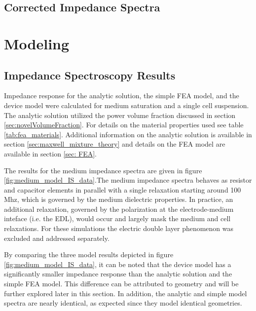 \FloatBarrier

\subsection{Corrected Impedance Spectra}

\FloatBarrier

\section{Modeling}

\subsection{Impedance Spectroscopy Results}

\par Impedance response for the analytic solution, the simple FEA model, and the device model were calculated for medium saturation and a single cell suspension. The analytic solution utilized the power volume fraction discussed in section \ref{sec:novelVolumeFraction}. For details on the material properties used see table \ref{tab:fea_materials}. Additional information on the analytic solution is available in section \ref{sec:maxwell_mixture_theory} and details on the FEA model are available in section \ref{sec: FEA}. 

\par The results for the medium impedance spectra are given in figure \ref{fig:medium_model_IS_data}.The medium impedance spectra behaves as resistor and capacitor elements in parallel with a single relaxation starting around 100 Mhz, which is governed by the medium dielectric properties. In practice, an additional relaxation, governed by the polarization at the electrode-medium inteface (i.e. the EDL), would occur and largely mask the medium and cell relaxations. For these simulations the electric double layer phenomenon was excluded and addressed separately.

\par By comparing the three model results depicted in figure \ref{fig:medium_model_IS_data}, it can be noted that the device model has a significantly smaller impedance response than the analytic solution and the simple FEA model. This difference can be attributed to geometry and will be further explored later in this section. In addition, the analytic and simple model spectra are nearly identical, as expected since they model identical geometries.

